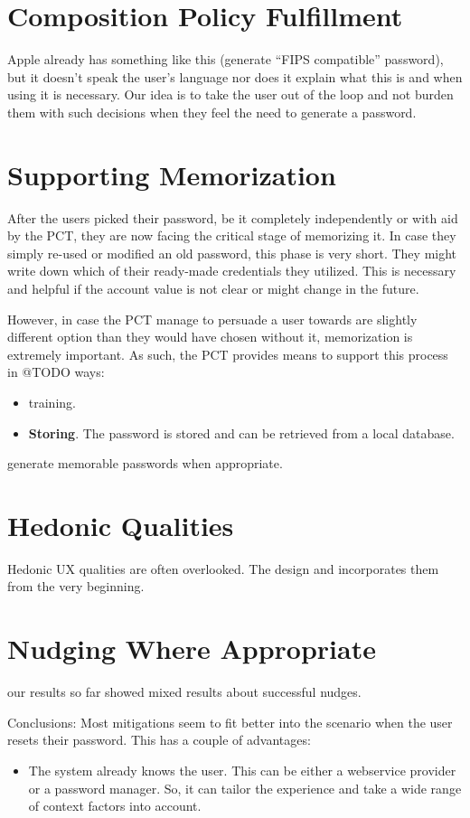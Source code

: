 \section{Composition Policy Fulfillment}
Apple already has something like this (generate ``FIPS compatible'' password), but it doesn't speak the user's language nor does it explain what this is and when using it is necessary. Our idea is to take the user out of the loop and not burden them with such decisions when they feel the need to generate a password. 

\section{Supporting Memorization}
After the users picked their password, be it completely independently or with aid by the PCT, they are now facing the critical stage of memorizing it. In case they simply re-used or modified an old password, this phase is very short. They might write down which of their ready-made credentials they utilized. This is necessary and helpful if the account value is not clear or might change in the future. 

However, in case the PCT manage to persuade a user towards are slightly different option than they would have chosen without it, memorization is extremely important. As such, the PCT provides means to support this process in @TODO ways:
\begin{itemize}
\item training. 
\item \textbf{Storing}. The password is stored and can be retrieved from a local database. 
\end{itemize}

generate memorable passwords when appropriate. 

\section{Hedonic Qualities}
Hedonic UX qualities are often overlooked. The design and incorporates them from the very beginning. 

\section{Nudging Where Appropriate}
our results so far showed mixed results about successful nudges. 


Conclusions: Most mitigations seem to fit better into the scenario when the user resets their password. This has a couple of advantages:
\begin{itemize}
	\item The system already knows the user. This can be either a webservice provider or a password manager. So, it can tailor the experience and take a wide range of context factors into account. 
\end{itemize}


